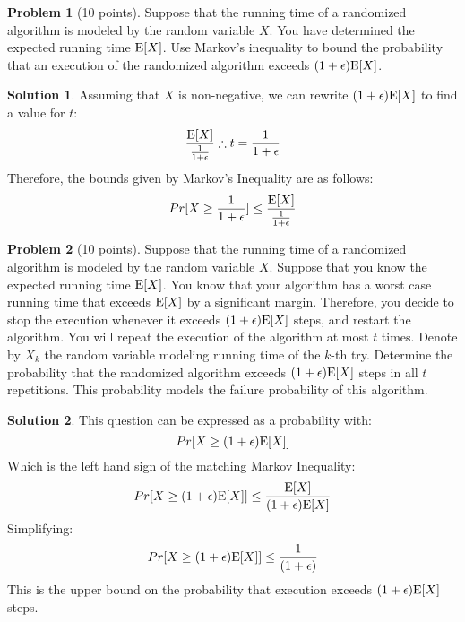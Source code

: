 \documentclass{article}
\theoremstyle{definition}
\newtheorem{problem}{Problem}
\newtheorem*{solution}{Solution}
\newcommand{\E}{\textup{E}}
\begin{document}
\begin{problem}[10 points]
Suppose that the running time of a randomized algorithm is modeled by
the random variable $X$. You have determined the expected running time
$\E[X]$. Use Markov's inequality to bound the probability that an
execution of the randomized algorithm exceeds
$(1+\epsilon)\E[X]$. 
\end{problem}
\begin{solution}
Assuming that $X$ is non-negative, we can rewrite $(1 + \epsilon)\E[X]$ to find a value for $t$:
$$ \frac{\E[X]}{\frac{1}{1+\epsilon}} \therefore t = \frac{1}{1+\epsilon} $$
Therefore, the bounds given by Markov's Inequality are as follows:
$$ Pr[X \geq \frac{1}{1+\epsilon}] \leq \frac{\E[X]}{\frac{1}{1+\epsilon}} $$
\end{solution}

\begin{problem}[10 points]
Suppose that the running time of a randomized algorithm is modeled by
the random variable $X$. Suppose that you know the expected running time
$\E[X]$. You know that your algorithm has a worst case running time
that exceeds $\E[X]$ by a significant margin. Therefore, you decide
to stop the execution whenever it exceeds $(1+\epsilon)\E[X]$ steps,
and restart the algorithm. You will repeat the execution of the
algorithm at most $t$ times. Denote by $X_k$ the random variable
modeling running time of the $k$-th try. Determine the probability
that the randomized algorithm exceeds  $(1+\epsilon)\E[X]$ steps in
all $t$ repetitions. This probability models the failure probability
of this algorithm.
\end{problem}
\begin{solution}
This question can be expressed as a probability with:
$$ Pr[X \geq (1+\epsilon)\E[X]] $$
Which is the left hand sign of the matching Markov Inequality:
$$ Pr[X \geq (1+\epsilon)\E[X]] \leq \frac{\E[X]}{(1+\epsilon)\E[X]} $$
Simplifying:
$$ Pr[X \geq (1+\epsilon)\E[X]] \leq \frac{1}{(1+\epsilon)} $$
This is the upper bound on the probability that execution exceeds $(1+\epsilon)\E[X]$ steps.
\end{solution}
\end{document}
